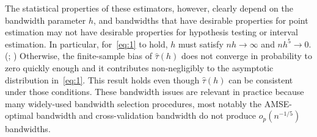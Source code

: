 \documentclass[12pt,fleqn]{article}
\begin{document}
The statistical properties of these estimators, however, clearly depend on the
bandwidth parameter $h$, and bandwidths that have desirable properties for point
estimation may not have desirable properties for hypothesis testing or interval
estimation. In particular, for~\eqref{eq:1} to hold, $h$ must satisfy
$n h \to \infty$ and $n h^5 \to 0$. (\citealp{HTV2001}; \citealp{Porter03})
Otherwise, the finite-sample bias of $\hat\tau(h)$ does not converge in
probability to zero quickly enough and it contributes non-negligibly to the
asymptotic distribution in~\eqref{eq:1}. This result holds even though
$\hat\tau(h)$ can be consistent under those conditions.  These bandwidth issues
are relevant in practice because many widely-used bandwidth selection
procedures, most notably the AMSE-optimal bandwidth and cross-validation
bandwidth \citep{IK} do not produce $o_{p}(n^{-1/5})$ bandwidths.
\end{document}

